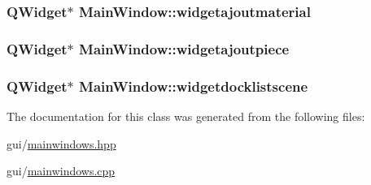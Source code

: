 \hypertarget{class_main_window_a071e7995e629a7b42ddbc5f54eae7dd3}{
\subsubsection[{widgetajoutmaterial}]{\setlength{\rightskip}{0pt plus 5cm}Q\+Widget$\ast$ Main\+Window\+::widgetajoutmaterial\hspace{0.3cm}{\ttfamily [private]}}}\label{class_main_window_a071e7995e629a7b42ddbc5f54eae7dd3}
\hypertarget{class_main_window_a81a3c7e272f0bc32762ef85575fe271d}{
\subsubsection[{widgetajoutpiece}]{\setlength{\rightskip}{0pt plus 5cm}Q\+Widget$\ast$ Main\+Window\+::widgetajoutpiece\hspace{0.3cm}{\ttfamily [private]}}}\label{class_main_window_a81a3c7e272f0bc32762ef85575fe271d}
\hypertarget{class_main_window_a38d553a96a3898e65b500c639673b8de}{
\subsubsection[{widgetdocklistscene}]{\setlength{\rightskip}{0pt plus 5cm}Q\+Widget$\ast$ Main\+Window\+::widgetdocklistscene\hspace{0.3cm}{\ttfamily [private]}}}\label{class_main_window_a38d553a96a3898e65b500c639673b8de}


The documentation for this class was generated from the following files\+:\begin{DoxyCompactItemize}
\item 
gui/\hyperlink{mainwindows_8hpp}{mainwindows.\+hpp}\item 
gui/\hyperlink{mainwindows_8cpp}{mainwindows.\+cpp}\end{DoxyCompactItemize}
